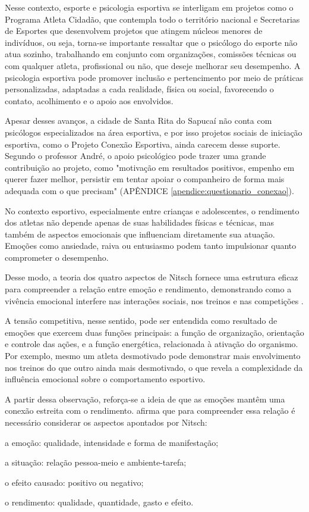 \begin{Desenvolvimento}
Nesse contexto, esporte e psicologia esportiva se interligam em projetos como o Programa Atleta Cidadão, que contempla todo o território nacional e Secretarias de Esportes que desenvolvem projetos que atingem núcleos menores de indivíduos, ou seja, torna-se importante  ressaltar que o psicólogo do esporte não atua sozinho, trabalhando em conjunto com organizações, comissões técnicas ou com qualquer atleta, profissional ou não, que deseje melhorar seu desempenho. A psicologia esportiva pode promover inclusão e pertencimento por meio de práticas personalizadas, adaptadas a cada realidade, física ou social, favorecendo o contato, acolhimento e o apoio aos envolvidos.

Apesar desses avanços, a cidade de Santa Rita do Sapucaí não conta com psicólogos especializados na área esportiva, e por isso projetos sociais de iniciação esportiva, como o Projeto Conexão Esportiva, ainda carecem desse suporte. Segundo o professor André, o apoio psicológico pode trazer uma grande contribuição ao projeto, como "motivação em resultados positivos, empenho em querer fazer melhor, persistir em tentar apoiar o companheiro de forma mais adequada com o que precisam" (APÊNDICE \ref{apendice:questionario_conexao}).

No contexto esportivo, especialmente entre crianças e adolescentes, o rendimento dos atletas não depende apenas de suas habilidades físicas e técnicas, mas também de aspectos emocionais que influenciam diretamente sua atuação. Emoções como ansiedade, raiva ou entusiasmo podem tanto impulsionar quanto comprometer o desempenho.

Desse modo, a teoria dos quatro aspectos de Nitsch fornece uma estrutura eficaz para compreender a relação entre emoção e rendimento, demonstrando como a vivência emocional interfere nas interações sociais, nos treinos e nas competições .

A tensão competitiva, nesse sentido, pode ser entendida como resultado de emoções que exercem duas funções principais: a função de organização, orientação e controle das ações, e a função energética, relacionada à ativação do organismo. Por exemplo, mesmo um atleta desmotivado pode demonstrar mais envolvimento nos treinos do que outro ainda mais desmotivado, o que revela a complexidade da influência emocional sobre o comportamento esportivo.

A partir dessa observação, reforça-se a ideia de que as emoções mantêm uma conexão estreita com o rendimento.  afirma que para compreender essa relação é necessário considerar os aspectos apontados por Nitsch:
\begin{alinea}
  \item a emoção: qualidade, intensidade e forma de manifestação;
  \item a situação: relação pessoa-meio e ambiente-tarefa;
  \item o efeito causado: positivo ou negativo;
  \item o rendimento: qualidade, quantidade, gasto e efeito.  
\end{alinea}


\end{Desenvolvimento}
